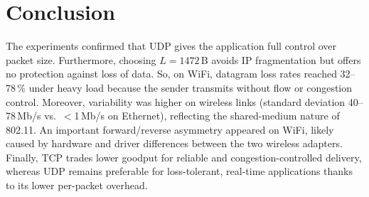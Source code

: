 \section{Conclusion}

The experiments confirmed that UDP gives the application full control over packet size. Furthermore, choosing $L = 1472$\,B avoids IP fragmentation but offers no protection against loss of data. So, on WiFi, datagram loss rates reached 32--78\,\% under heavy load because the sender transmits without flow or congestion control. Moreover, variability was higher on wireless links (standard deviation 40--78\,Mb/s vs.\ $<$1\,Mb/s on Ethernet), reflecting the shared-medium nature of 802.11. An important forward/reverse asymmetry appeared on WiFi, likely caused by hardware and driver differences between the two wireless adapters. Finally, TCP trades lower goodput for reliable and congestion-controlled delivery, whereas UDP remains preferable for loss-tolerant, real-time applications thanks to its lower per-packet overhead.
